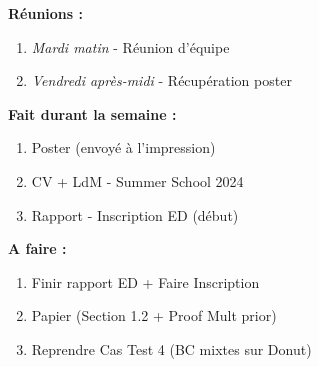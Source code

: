 \textbf{Réunions :}
\begin{enumerate}[label=\textbullet]
	\item \textit{Mardi matin} - Réunion d'équipe
	\item \textit{Vendredi après-midi} - Récupération poster
\end{enumerate}
\textbf{Fait durant la semaine :}
\begin{enumerate}[label=\textbullet]
	\item Poster (envoyé à l'impression)
	\item CV + LdM - Summer School 2024
	\item Rapport - Inscription ED (début)
\end{enumerate}
\textbf{A faire :}
\begin{enumerate}[label=\textbullet]
	\item Finir rapport ED + Faire Inscription
	\item Papier (Section 1.2 + Proof Mult prior)
	\item Reprendre Cas Test 4 (BC mixtes sur Donut)
\end{enumerate}